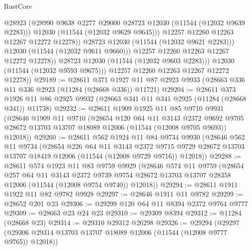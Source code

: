 \begin{lexlean}{RustCore}
\begin{coremodule}
                          @28923
                          (@28990 @9638 @2277 @29000 @28723 @12030 (@11544 (@12032 @9639 @2283)))
                          @12030
                          (@11544 (@12032 @9629 @9645)))
                        @12257
                        @12260
                        @12263
                        @12267
                        @12272
                        @12278))
                    @28723
                    @12030
                    (@11544 (@12032 @9621 @2283)))
                  @12030
                  (@11544 (@12032 @9611 @9660)))
                @12257
                @12260
                @12263
                @12267
                @12272
                @12278))
            @28723
            @12030
            (@11544 (@12032 @9603 @2283)))
          @12030
          (@11544 (@12032 @9593 @9675)))
        @12257
        @12260
        @12263
        @12267
        @12272
        @12278))
@29189 := @28611
    @371
    @1927
    @11
    @87
    @2923
    @9933
    (@28663 @336 @11 @336 @2923 (@11284 (@28668 @336)) @11721)
@29204 := @28611
    @373
    @1926
    @11
    @86
    @2925
    @9932
    (@28663 @341 @11 @341 @2925 (@11284 (@28668 @341)) @11738)
@29232 := @28611
    @1909
    @1925
    @11
    @85
    @9710
    @9931
    (@28646
      @1909
      @11
      @9710
      (@28654
        @120
        @64
        @11
        @3143
        @2372
        @9692
        @9705
        @28672
        @13703
        @13707
        @18089
        @12006
        (@11544 (@12008 @9705 @9693))
        @12018))
@29260 := @28611
    @562
    @1924
    @11
    @84
    @9734
    @9930
    (@28646
      @562
      @11
      @9734
      (@28654
        @226
        @64
        @11
        @3143
        @2372
        @9715
        @9729
        @28672
        @13703
        @13707
        @18419
        @12006
        (@11544 (@12008 @9729 @9716))
        @12018))
@29288 := @28611
    @574
    @1923
    @11
    @83
    @9759
    @9929
    (@28646
      @574
      @11
      @9759
      (@28654
        @257
        @64
        @11
        @3143
        @2372
        @9739
        @9754
        @28672
        @13703
        @13707
        @28358
        @12006
        (@11544 (@12008 @9754 @9740))
        @12018))
@29294 := @28611 @1911 @1922 @11 @82 @9782 @9928
@29297 := @28646 @1911 @11 @9782
@29299 := @28652 @201 @23
@29306 := @29299 @120 @64 @11 @8394 @2372 @9764 @9777
@29309 := @28663 @23 @24 @23
@29310 := @29309 @8394
@29312 := @11284 (@28668 @23)
@29314 := @29310 @29312 @26298
@29326 := @29294
    (@29297 (@29306 @29314 @13703 @13707 @18089 @12006 (@11544 (@12008 @9777 @9765)) @12018))

\end{coremodule}
\end{lexlean}
